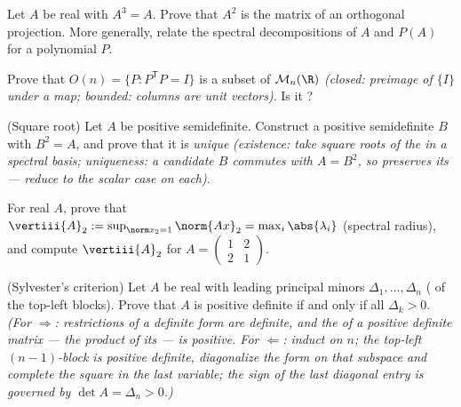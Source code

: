 \begin{exercise}[$\star\star$]\label{exo:b2:quadratic:4}
Let $A$ be real  with $A^3 = A$. Prove that $A^2$ is the
matrix of an orthogonal projection. More generally, relate the
spectral decompositions of $A$ and $P(A)$ for a polynomial $P$.
\end{exercise}

\begin{exercise}[$\star\star$]\label{exo:b2:quadratic:5}
Prove that $O(n) = \{P : P^{\mathsf T}P = I\}$ is a  subset
of $\mathcal{M}_n(\R)$ \emph{(closed: preimage of $\{I\}$ under a
 map; bounded: columns are unit vectors)}. Is it
?
\end{exercise}

\begin{exercise}[$\star\star$]\label{exo:b2:quadratic:6}
(Square root) Let $A$ be  positive semidefinite. Construct
a  positive semidefinite $B$ with $B^2 = A$, and prove
that it is \emph{unique} \emph{(existence: take square roots of the
 in a spectral basis; uniqueness: a candidate $B$
commutes with $A = B^2$, so preserves its  --- reduce to
the scalar case on each)}.
\end{exercise}

\begin{exercise}[$\star\star$]\label{exo:b2:quadratic:7}
For real  $A$, prove that $\vertiii{A}_2 :=
\sup_{\norm x_2 = 1}\norm{Ax}_2 = \max_i \abs{\lambda_i}$
(spectral radius), and compute $\vertiii{A}_2$ for $A =
\begin{pmatrix} 1 & 2\\ 2 & 1\end{pmatrix}$.
\end{exercise}

\begin{exercise}[$\star\star\star$]\label{exo:b2:quadratic:8}
(Sylvester's criterion) Let $A$ be real  with leading
principal minors $\Delta_1, \dots, \Delta_n$ ( of the
top-left blocks). Prove that $A$ is positive definite if and only
if all $\Delta_k > 0$. \emph{(For $\Rightarrow$: restrictions of a
definite form are definite, and the  of a positive
definite matrix --- the product of its  --- is positive.
For $\Leftarrow$: induct on $n$; the top-left $(n-1)$-block is
positive definite, diagonalize the form on that subspace and
complete the square in the last variable; the sign of the last
diagonal entry is governed by $\det A = \Delta_n > 0$.)}
\end{exercise}

